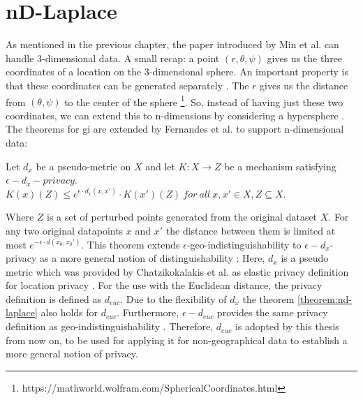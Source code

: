 \section{nD-Laplace}
As mentioned in the previous chapter, the paper introduced by Min et al. can handle 3-dimensional data.
A small recap: a point $(r, \theta, \psi)$ gives us the three coordinates of a location on the 3-dimensional sphere.
An important property is that these coordinates can be generated separately \citep{DBLP:journals/corr/abs-1212-1984, 9646489}.
The $r$ gives us the distance from $(\theta, \psi)$ to the center of the sphere \footnote{https://mathworld.wolfram.com/SphericalCoordinates.html}.
So, instead of having just these two coordinates, we can extend this to n-dimensions by considering a hypersphere \citep{fernandes_generalised_2019, 9646489}.
The theorems for \gls{gi} are extended by Fernandes et al. to support n-dimensional data:
\begin{theorem}
  Let $d_x$ be a pseudo-metric on $X$ and let $K: X \rightarrow Z$ be a mechanism satisfying $\epsilon-d_x-privacy$. \\
  $K(x)(Z) \leq e^{\epsilon \cdot d_x (x, x')} \cdot K(x')(Z) \ for \ all \ x, x' \in X, Z \subseteq X$.
  \label{theorem:nd-laplace}
\end{theorem}
Where $Z$ is a set of perturbed points generated from the original dataset $X$. 
For any two original datapoints $x$ and $x'$ the distance between them is limited at most $e^{-\epsilon \cdot d(x_0, x_0')}$. 
This theorem extends $\epsilon$-geo-indistinguishability to $\epsilon-d_x$-privacy as a more general notion of distinguishability \citep{fernandes_generalised_2019}:
Here, $d_x$ is a pseudo metric which was provided by Chatzikokalakis et al. as elastic privacy definition for location privacy \citep{chatzikokolakis_constructing_2015}. For the use with the Euclidean distance, the privacy definition is defined as $d_{euc}$. Due to the flexibility of $d_x$ the theorem \ref{theorem:nd-laplace} also holds for $d_{euc}$.  Furthermore, $\epsilon-d_{euc}$ provides the same privacy definition as geo-indistinguishability \citep{chatzikokolakis_constructing_2015}.
Therefore, $d_{euc}$ is adopted by this thesis from now on, to be used for applying it for non-geographical data to establish a more general notion of privacy. \newline

